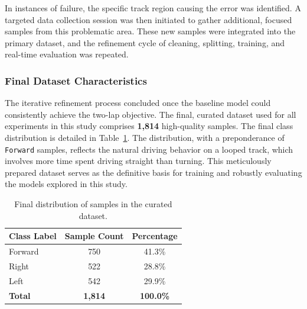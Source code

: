 In instances of failure, the specific track region causing the error was identified. A targeted data collection session was then initiated to gather additional, focused samples from this problematic area. These new samples were integrated into the primary dataset, and the refinement cycle of cleaning, splitting, training, and real-time evaluation was repeated.

\subsubsection{Final Dataset Characteristics}
The iterative refinement process concluded once the baseline model could consistently achieve the two-lap objective. The final, curated dataset used for all experiments in this study comprises \textbf{1,814} high-quality samples. The final class distribution is detailed in Table~\ref{tab:dataset_dist}. The distribution, with a preponderance of \texttt{Forward} samples, reflects the natural driving behavior on a looped track, which involves more time spent driving straight than turning. This meticulously prepared dataset serves as the definitive basis for training and robustly evaluating the models explored in this study.

\begin{table}[h!]
\centering
\caption{Final distribution of samples in the curated dataset.}
\label{tab:dataset_dist}
\begin{tabular}{@{}lcc@{}}
\toprule
\textbf{Class Label} & \textbf{Sample Count} & \textbf{Percentage} \\ \midrule
Forward              & 750                   & 41.3\%              \\
Right                & 522                   & 28.8\%              \\
Left                 & 542                   & 29.9\%              \\ \midrule
\textbf{Total}       & \textbf{1,814}        & \textbf{100.0\%}    \\ \bottomrule
\end{tabular}
\end{table}





